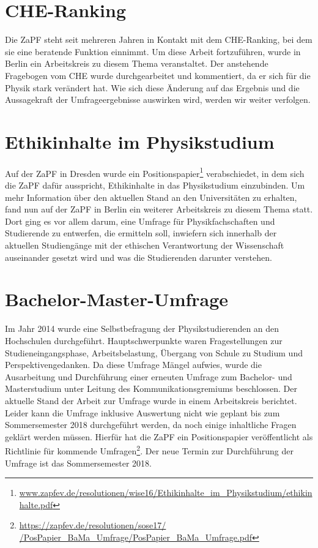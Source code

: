 \documentclass[a4paper]{article}
\begin{document}
\section*{CHE-Ranking} 
Die  ZaPF steht seit mehreren Jahren in Kontakt mit dem CHE-Ranking, bei dem  sie eine beratende Funktion einnimmt. Um diese Arbeit fortzuführen, wurde in Berlin ein Arbeitskreis zu  diesem Thema veranstaltet. Der anstehende Fragebogen vom CHE wurde durchgearbeitet und kommentiert, da er sich für die Physik stark verändert hat. Wie sich diese Änderung auf das Ergebnis und die Aussagekraft der Umfrageergebnisse auswirken wird, werden wir weiter verfolgen.


\section*{Ethikinhalte im Physikstudium}
Auf der ZaPF in Dresden wurde ein Positionspapier\footnote{\href{https://zapfev.de/resolutionen/wise16/Ethikinhalte_im_Physikstudium/ethikinhalte.pdf}{\url{www.zapfev.de/resolutionen/wise16/Ethikinhalte_im_Physikstudium/ethikinhalte.pdf}}}  verabschiedet, in dem sich die ZaPF dafür ausspricht, Ethikinhalte in das Physikstudium einzubinden. 
Um  mehr Information über den aktuellen Stand an den Universitäten zu  erhalten, fand nun auf der ZaPF in Berlin ein weiterer Arbeitskreis zu  diesem Thema statt. Dort ging es vor allem darum, eine Umfrage für  Physikfachschaften und Studierende zu entwerfen, die ermitteln soll, inwiefern  sich innerhalb der aktuellen Studiengänge mit der ethischen  Verantwortung der Wissenschaft auseinander gesetzt wird und was die  Studierenden darunter verstehen.


\section*{Bachelor-Master-Umfrage}
Im  Jahr 2014 wurde eine Selbstbefragung der Physikstudierenden an den  Hochschulen durchgeführt. Hauptschwerpunkte waren Fragestellungen zur  Studieneingangsphase, 
Arbeitsbelastung,  Übergang von Schule zu Studium und Perspektivengedanken. Da diese  Umfrage Mängel aufwies, wurde die Ausarbeitung und Durchführung einer  erneuten 
Umfrage zum Bachelor- und Masterstudium unter Leitung des Kommunikationsgremiums beschlossen. Der  aktuelle Stand der Arbeit zur Umfrage wurde in einem Arbeitskreis berichtet. Leider kann die Umfrage inklusive Auswertung nicht wie geplant bis zum Sommersemester 2018  durchgeführt werden, da noch einige inhaltliche Fragen geklärt werden müssen. Hierfür hat die ZaPF ein Positionspapier  veröffentlicht als Richtlinie für kommende Umfragen\footnote{\href{https://zapfev.de/resolutionen/sose17//PosPapier_BaMa_Umfrage/PosPapier_BaMa_Umfrage.pdf}{\url{https://zapfev.de/resolutionen/sose17/
/PosPapier_BaMa_Umfrage/PosPapier_BaMa_Umfrage.pdf}}}. Der neue Termin zur Durchführung der Umfrage ist das Sommersemester 2018.
\end{document}

